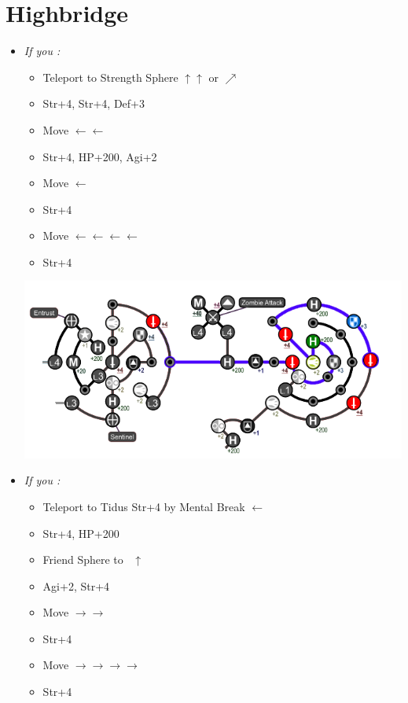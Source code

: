 \chapter{Highbridge}
\begin{spheregrid}
  \begin{itemize}
    \yunaf
    \item \textit{If you \wonblitz:}
          \begin{itemize}
            \item Teleport to Strength Sphere $\uparrow\uparrow$ or $\nearrow$
            \item Str+4, Str+4, Def+3
            \item Move $\leftarrow\leftarrow$
            \item Str+4, HP+200, Agi+2
            \item Move $\leftarrow$
            \item Str+4
            \item Move $\leftarrow\leftarrow\leftarrow\leftarrow$
            \item Str+4
          \end{itemize}
          \includegraphics[width=.9\columnwidth]{graphics/Yuna_blitz_win_1}
    \item \textit{If you \lostblitz:}
          \begin{itemize}
            \item Teleport to Tidus Str+4 by Mental Break $\leftarrow$
            \item Str+4, HP+200
            \item Friend Sphere to \tidus\ $\uparrow$
            \item Agi+2, Str+4
            \item Move $\rightarrow\rightarrow$
            \item Str+4
            \item Move $\rightarrow\rightarrow\rightarrow\rightarrow$
            \item Str+4

\end{itemize}
\end{itemize}
\end{spheregrid}
